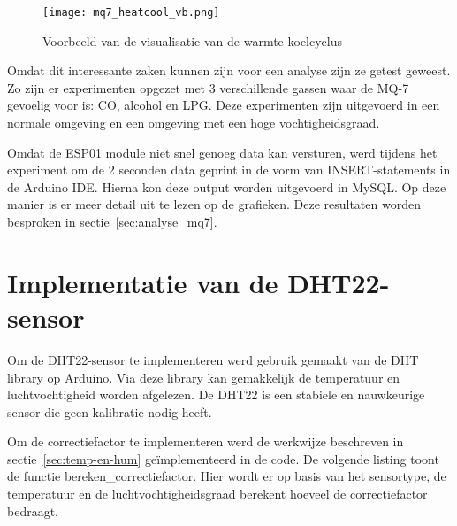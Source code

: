 \begin{figure}[h]
    \texttt{[image: mq7\_heatcool\_vb.png]}
    \caption[Warmte-koelcyclus in de praktijk]{Voorbeeld van de visualisatie van de warmte-koelcyclus}
    \label{fig:mq7_heatcool_vb}
\end{figure}


Omdat dit interessante zaken kunnen zijn voor een analyse zijn ze getest geweest. Zo zijn er experimenten opgezet met 3 verschillende gassen waar de MQ-7 gevoelig voor is: CO, alcohol en LPG. Deze experimenten zijn uitgevoerd in een normale omgeving en een omgeving met een hoge vochtigheidsgraad.


Omdat de ESP01 module niet snel genoeg data kan versturen, werd tijdens het experiment om de 2 seconden data geprint in de vorm van INSERT-statements in de Arduino IDE. Hierna kon deze output worden uitgevoerd in MySQL. Op deze manier is er meer detail uit te lezen op de grafieken. Deze resultaten worden besproken in sectie~\ref{sec:analyse_mq7}.




\section{Implementatie van de DHT22-sensor}%
\label{sec:dht22}


Om de DHT22-sensor te implementeren werd gebruik gemaakt van de DHT library op Arduino. Via deze library kan gemakkelijk de temperatuur en luchtvochtigheid worden afgelezen. De DHT22 is een stabiele en nauwkeurige sensor die geen kalibratie nodig heeft.

Om de correctiefactor te implementeren werd de werkwijze beschreven in sectie~\ref{sec:temp-en-hum} geïmplementeerd in de code. De volgende listing toont de functie bereken\_correctiefactor. Hier wordt er op basis van het sensortype, de temperatuur en de luchtvochtigheidsgraad berekent hoeveel de correctiefactor bedraagt.

